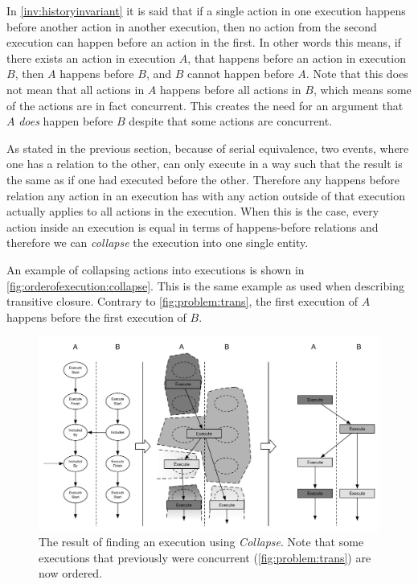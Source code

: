 	\newpar In \autoref{inv:historyinvariant} it is said that if a single action in one execution happens before another action in another execution, then no action from the second execution can happen before an action in the first. In other words this means, if there exists an action in execution $A$, that happens before an action in execution $B$, then $A$ happens before $B$, and $B$ cannot happen before $A$. Note that this does not mean that all actions in $A$ happens before all actions in $B$, which means some of the actions are in fact concurrent. This creates the need for an argument that $A$ \textit{does} happen before $B$ despite that some actions are concurrent.
	
	\newpar As stated in the previous section, because of serial equivalence, two events, where one has a relation to the other, can only execute in a way such that the result is the same as if one had executed before the other. Therefore any happens before relation any action in an execution has with any action outside of that execution actually applies to all actions in the execution. When this is the case, every action inside an execution is equal in terms of happens-before relations and therefore we can \textit{collapse} the execution into one single entity.
	
	\newpar An example of collapsing actions into executions is shown in \autoref{fig:orderofexecution:collapse}. This is the same example as used when describing transitive closure. Contrary to \autoref{fig:problem:trans}, the first execution of $A$ happens before the first execution of $B$.
	
	\begin{figure}[H]
		\centering
		\includegraphics[width=\textwidth]{5orderofexecution/images/collapse.pdf}
		\caption{The result of finding an execution using \textit{Collapse}. Note that some executions that previously were concurrent (\autoref{fig:problem:trans}) are now ordered.}
		\label{fig:orderofexecution:collapse}
	\end{figure}
	
